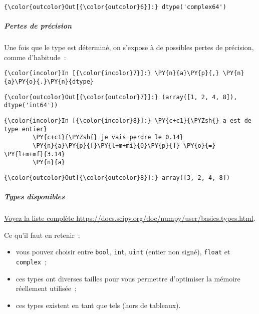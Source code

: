 \begin{Verbatim}[commandchars=\\\{\}]
{\color{outcolor}Out[{\color{outcolor}6}]:} dtype('complex64')
\end{Verbatim}
            
    \hypertarget{pertes-de-pruxe9cision}{%
\subparagraph{Pertes de précision}\label{pertes-de-pruxe9cision}}

    Une fois que le type est déterminé, on s'expose à de possibles pertes de
précision, comme d'habitude~:

    \begin{Verbatim}[commandchars=\\\{\}]
{\color{incolor}In [{\color{incolor}7}]:} \PY{n}{a}\PY{p}{,} \PY{n}{a}\PY{o}{.}\PY{n}{dtype}
\end{Verbatim}


\begin{Verbatim}[commandchars=\\\{\}]
{\color{outcolor}Out[{\color{outcolor}7}]:} (array([1, 2, 4, 8]), dtype('int64'))
\end{Verbatim}
            
    \begin{Verbatim}[commandchars=\\\{\}]
{\color{incolor}In [{\color{incolor}8}]:} \PY{c+c1}{\PYZsh{} a est de type entier}
        \PY{c+c1}{\PYZsh{} je vais perdre le 0.14}
        \PY{n}{a}\PY{p}{[}\PY{l+m+mi}{0}\PY{p}{]} \PY{o}{=} \PY{l+m+mf}{3.14}
        \PY{n}{a}
\end{Verbatim}


\begin{Verbatim}[commandchars=\\\{\}]
{\color{outcolor}Out[{\color{outcolor}8}]:} array([3, 2, 4, 8])
\end{Verbatim}
            
    \hypertarget{types-disponibles}{%
\subparagraph{Types disponibles}\label{types-disponibles}}

    \href{https://docs.scipy.org/doc/numpy/user/basics.types.html}{Voyez la
liste complète https://docs.scipy.org/doc/numpy/user/basics.types.html}.

Ce qu'il faut en retenir~:

\begin{itemize}
\tightlist
\item
  vous pouvez choisir entre \texttt{bool}, \texttt{int}, \texttt{uint}
  (entier non signé), \texttt{float} et \texttt{complex}~;
\item
  ces types ont diverses tailles pour vous permettre d'optimiser la
  mémoire réellement utilisée~;
\item
  ces types existent en tant que tels (hors de tableaux).
\end{itemize}


